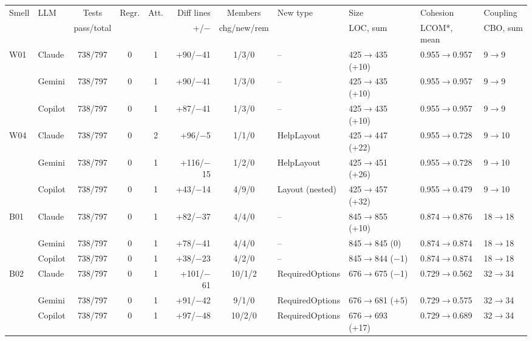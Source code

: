 \begin{tabular}{@{}l l c c c r c l l l l@{}}
\toprule
Smell & LLM & Tests & Regr. & Att. & Diff lines & Members & New type & Size & Cohesion & Coupling \\
 & & pass/total & & & +/$-$ & chg/new/rem & & LOC, sum & LCOM*, mean & CBO, sum \\
\midrule
W01 & Claude & 738/797 & 0 & 1 & +90/$-$41 & 1/3/0 & -- & 425$\to$435 (+10) & 0.955$\to$0.957 & 9$\to$9 \\
 & Gemini & 738/797 & 0 & 1 & +90/$-$41 & 1/3/0 & -- & 425$\to$435 (+10) & 0.955$\to$0.957 & 9$\to$9 \\
 & Copilot & 738/797 & 0 & 1 & +87/$-$41 & 1/3/0 & -- & 425$\to$435 (+10) & 0.955$\to$0.957 & 9$\to$9 \\
\addlinespace[3pt]
W04 & Claude & 738/797 & 0 & 2 & +96/$-$5 & 1/1/0 & HelpLayout & 425$\to$447 (+22) & 0.955$\to$0.728 & 9$\to$10 \\
 & Gemini & 738/797 & 0 & 1 & +116/$-$15 & 1/2/0 & HelpLayout & 425$\to$451 (+26) & 0.955$\to$0.728 & 9$\to$10 \\
 & Copilot & 738/797 & 0 & 1 & +43/$-$14 & 4/9/0 & Layout (nested) & 425$\to$457 (+32) & 0.955$\to$0.479 & 9$\to$10 \\
\addlinespace[3pt]
B01 & Claude & 738/797 & 0 & 1 & +82/$-$37 & 4/4/0 & -- & 845$\to$855 (+10) & 0.874$\to$0.876 & 18$\to$18 \\
 & Gemini & 738/797 & 0 & 1 & +78/$-$41 & 4/4/0 & -- & 845$\to$845 (0) & 0.874$\to$0.874 & 18$\to$18 \\
 & Copilot & 738/797 & 0 & 1 & +38/$-$23 & 4/2/0 & -- & 845$\to$844 ($-$1) & 0.874$\to$0.874 & 18$\to$18 \\
\addlinespace[3pt]
B02 & Claude & 738/797 & 0 & 1 & +101/$-$61 & 10/1/2 & RequiredOptions & 676$\to$675 ($-$1) & 0.729$\to$0.562 & 32$\to$34 \\
 & Gemini & 738/797 & 0 & 1 & +91/$-$42 & 9/1/0 & RequiredOptions & 676$\to$681 (+5) & 0.729$\to$0.575 & 32$\to$34 \\
 & Copilot & 738/797 & 0 & 1 & +97/$-$48 & 10/2/0 & RequiredOptions & 676$\to$693 (+17) & 0.729$\to$0.689 & 32$\to$34 \\
\bottomrule
\end{tabular}
